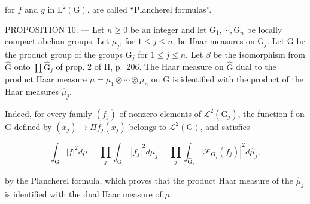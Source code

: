 for \(f\) and \(g\) in \(\mathrm{L}^2 (\mathrm{G})\), are called “Plancherel formulas”.

PROPOSITION 10. --- Let \(n \geqslant 0\) be an integer and let \(\mathrm{G}_{1}, \cdots, \mathrm{G}_{n}\) be locally compact abelian groups. Let \(\mu_{j}\), for \(1 \leqslant j \leqslant n\), be Haar measures on \(\mathrm{G}_{j}\). Let G be the product group of the groups \(\mathrm{G}_{j}\) for \(1 \leqslant j \leqslant n\). Let \(\beta\) be the isomorphism from \(\widehat{\mathrm{G}}\) onto \(\prod \widehat{\mathrm{G}}_{j}\) of prop. 2 of II, p.~206. The Haar measure on \(\widehat{\mathrm{G}}\) dual to the product Haar measure \(\mu = \mu_{1} \otimes \cdots \otimes \mu_{n}\) on G is identified with the product of the Haar measures \(\widehat{\mu}_{j}\).

Indeed, for every family \((f_{j})\) of nonzero elements of \(\mathcal{L}^{2}(\mathrm{G}_{j})\), the function f on G defined by \((x_{j})\mapsto\Pi f_{j}(x_{j})\) belongs to \(\mathcal{L}^{2}(\mathrm{G})\), and satisfies

\[
\int_ {\mathrm{G}} | f | ^ {2} d \mu = \prod_ {j} \int_ {\mathrm{G} _ {j}} | f _ {j} | ^ {2} d \mu_ {j} = \prod_ {j} \int_ {\widehat {\mathrm{G}} _ {j}} | \mathcal {F} _ {\mathrm{G} _ {j}} (f _ {j}) | ^ {2} d \widehat {\mu} _ {j},
\]

by the Plancherel formula, which proves that the product Haar measure of the \(\widehat{\mu}_{j}\) is identified with the dual Haar measure of \(\mu\).

